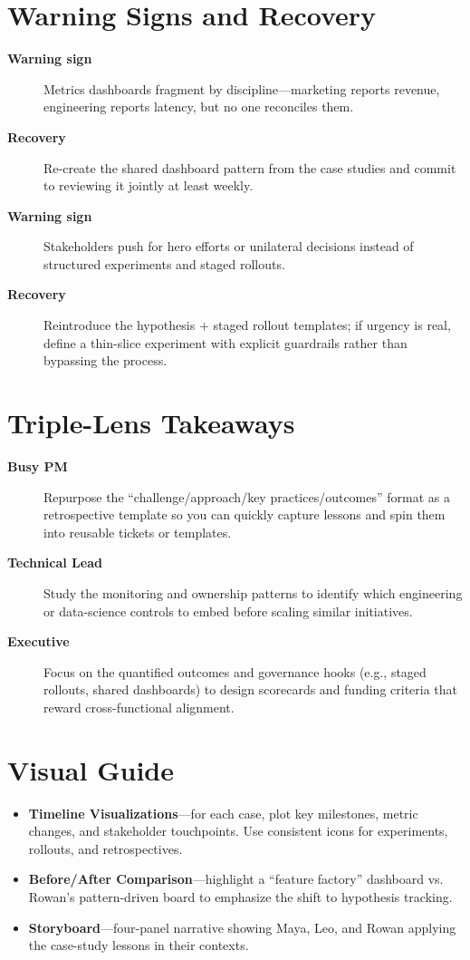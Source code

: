 \section{Warning Signs and Recovery}
\label{sec:case-warnings}
\begin{description}
    \item[\textbf{Warning sign}] Metrics dashboards fragment by discipline—marketing reports revenue, engineering reports latency, but no one reconciles them.
    \item[\textbf{Recovery}] Re-create the shared dashboard pattern from the case studies and commit to reviewing it jointly at least weekly.
    \item[\textbf{Warning sign}] Stakeholders push for hero efforts or unilateral decisions instead of structured experiments and staged rollouts.
    \item[\textbf{Recovery}] Reintroduce the hypothesis + staged rollout templates; if urgency is real, define a thin-slice experiment with explicit guardrails rather than bypassing the process.
\end{description}

\section{Triple-Lens Takeaways}
\label{sec:success-triple}

\begin{description}
    \item[\textbf{Busy PM}] Repurpose the ``challenge/approach/key practices/outcomes'' format as a retrospective template so you can quickly capture lessons and spin them into reusable tickets or templates.
    \item[\textbf{Technical Lead}] Study the monitoring and ownership patterns to identify which engineering or data-science controls to embed before scaling similar initiatives.
    \item[\textbf{Executive}] Focus on the quantified outcomes and governance hooks (e.g., staged rollouts, shared dashboards) to design scorecards and funding criteria that reward cross-functional alignment.
\end{description}
\section{Visual Guide}
\label{sec:case-visuals}
\begin{itemize}
    \item \textbf{Timeline Visualizations}—for each case, plot key milestones, metric changes, and stakeholder touchpoints. Use consistent icons for experiments, rollouts, and retrospectives.
    \item \textbf{Before/After Comparison}—highlight a ``feature factory'' dashboard vs. Rowan’s pattern-driven board to emphasize the shift to hypothesis tracking.
    \item \textbf{Storyboard}—four-panel narrative showing Maya, Leo, and Rowan applying the case-study lessons in their contexts.
\end{itemize}

